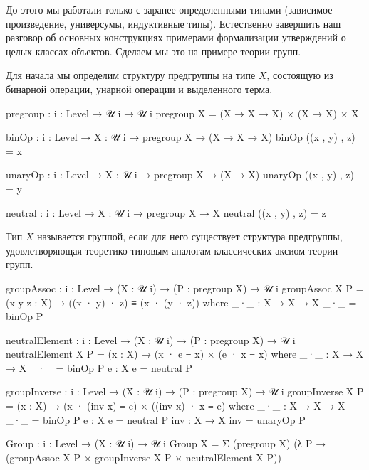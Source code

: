 \documentclass{article}[12pt]
\begin{document}
До этого мы работали только с заранее определенными типами (зависимое произведение, универсумы, индуктивные типы).
Естественно завершить наш разговор об основных конструкциях примерами формализации утверждений о целых классах
объектов. Сделаем мы это на примере теории групп.

Для начала мы определим структуру предгруппы на типе $X$, состоящую из бинарной операции, унарной операции и
выделенного терма.
\begin{code}
pregroup : {i : Level} → 𝒰 i → 𝒰 i
pregroup X = (X → X → X) × (X → X) × X

binOp : {i : Level} → {X : 𝒰 i} → pregroup X → (X → X → X)
binOp ((x , y) , z) = x

unaryOp : {i : Level} → {X : 𝒰 i} → pregroup X → (X → X)
unaryOp ((x , y) , z) = y

neutral : {i : Level} → {X : 𝒰 i} → pregroup X → X
neutral ((x , y) , z) = z
\end{code}
Тип $X$ называется группой, если для него существует структура предгруппы, удовлетворяющая теоретико-типовым
аналогам классических аксиом теории групп.
\begin{code}
groupAssoc : {i : Level} → (X : 𝒰 i) → (P : pregroup X) → 𝒰 i
groupAssoc X P = (x y z : X) → ((x · y) · z) ≡ (x · (y · z))
    where
        _·_ : X → X → X
        _·_ = binOp P

neutralElement : {i : Level} → (X : 𝒰 i) → (P : pregroup X) → 𝒰 i
neutralElement X P = (x : X) → (x · e ≡ x) × (e · x ≡ x)
    where
        _·_ : X → X → X
        _·_ = binOp P
        e : X
        e = neutral P

groupInverse : {i : Level} → (X : 𝒰 i) → (P : pregroup X) → 𝒰 i
groupInverse X P = (x : X) → (x · (inv x) ≡ e) × ((inv x) · x ≡ e)
    where
        _·_ : X → X → X
        _·_ = binOp P
        e : X
        e = neutral P
        inv : X → X
        inv = unaryOp P

Group : {i : Level} → (X : 𝒰 i) → 𝒰 i
Group X = Σ (pregroup X) 
            (λ P → (groupAssoc X P × groupInverse X P × neutralElement X P))
\end{code}
\end{document}
